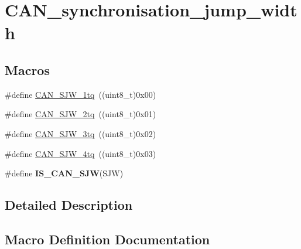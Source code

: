 \hypertarget{group___c_a_n__synchronisation__jump__width}{}\section{C\+A\+N\+\_\+synchronisation\+\_\+jump\+\_\+width}
\label{group___c_a_n__synchronisation__jump__width}
\subsection*{Macros}
\begin{DoxyCompactItemize}
\item 
\#define \hyperlink{group___c_a_n__synchronisation__jump__width_ga4e03d22ae683b63cb4df238449ec967c}{C\+A\+N\+\_\+\+S\+J\+W\+\_\+1tq}~((uint8\+\_\+t)0x00)
\item 
\#define \hyperlink{group___c_a_n__synchronisation__jump__width_gad39e7656c555cc00bc4d7c1bff39916f}{C\+A\+N\+\_\+\+S\+J\+W\+\_\+2tq}~((uint8\+\_\+t)0x01)
\item 
\#define \hyperlink{group___c_a_n__synchronisation__jump__width_gab4de740e2184aac71c2c8cba22a8ecd2}{C\+A\+N\+\_\+\+S\+J\+W\+\_\+3tq}~((uint8\+\_\+t)0x02)
\item 
\#define \hyperlink{group___c_a_n__synchronisation__jump__width_ga7f26a36d478c7ba1a1441b369d62f693}{C\+A\+N\+\_\+\+S\+J\+W\+\_\+4tq}~((uint8\+\_\+t)0x03)
\item 
\#define {\bfseries I\+S\+\_\+\+C\+A\+N\+\_\+\+S\+J\+W}(S\+J\+W)
\end{DoxyCompactItemize}


\subsection{Detailed Description}


\subsection{Macro Definition Documentation}
\hypertarget{group___c_a_n__synchronisation__jump__width_ga4e03d22ae683b63cb4df238449ec967c}{}
